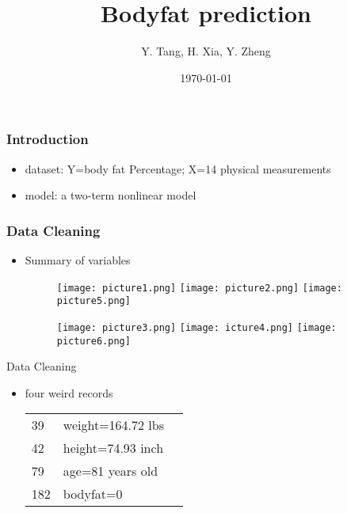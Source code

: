 \documentclass{beamer}
\title[Bodyfat prediction]{Bodyfat prediction} %
\author{Y. Tang, H. Xia, Y. Zheng} %
\institute[UWM] %
{
University of Wisconsin-Madison \\ %
}
\date{\today} %
\begin{document}
\begin{frame}
\titlepage %
\end{frame}

\begin{frame}
\frametitle{Introduction}
\begin{itemize}
\item dataset: Y=body fat Percentage;
               X=14 physical measurements 
\item model: a two-term nonlinear model
\end{itemize}

\end{frame}



\begin{frame}
\frametitle{Data Cleaning}
\begin{itemize}
\item Summary of variables

\begin{figure}[h]
   \centering
   \texttt{[image: picture1.png]}
   \texttt{[image: picture2.png]}
   \texttt{[image: picture5.png]}
\end{figure}
\begin{figure}[h]
   \centering
   \texttt{[image: picture3.png]}
   \texttt{[image: icture4.png]}
   \texttt{[image: picture6.png]}
\end{figure}
\end{itemize}
\end{frame}


\begin{frame}{Data Cleaning}
\begin{itemize}
\item four weird records 

\begin{table}
\begin{tabular}{l p{6cm} p{6cm}}
\hline
39 & weight=164.72 lbs \\
42 & height=74.93 inch \\
79 & age=81 years old \\
182 & bodyfat=0


\end{tabular}
\end{table}
\end{itemize}
\end{frame}
\end{document}

